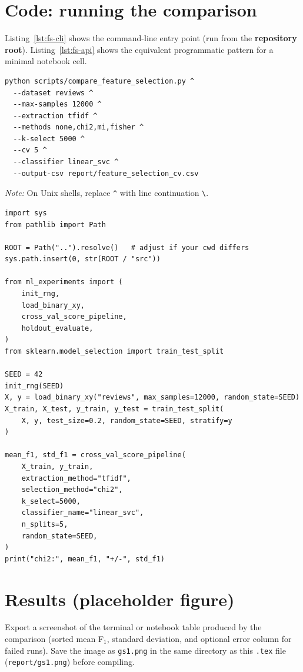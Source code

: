 \documentclass[11pt,a4paper]{report}
\begin{document}
\section{Code: running the comparison}

Listing~\ref{lst:fs-cli} shows the command-line entry point (run from the \textbf{repository root}). Listing~\ref{lst:fs-api} shows the equivalent programmatic pattern for a minimal notebook cell.

\begin{lstlisting}[style=py, caption={Shell: compare selectors with fixed TF---IDF and linear SVM (example).}, label={lst:fs-cli}]
python scripts/compare_feature_selection.py ^
  --dataset reviews ^
  --max-samples 12000 ^
  --extraction tfidf ^
  --methods none,chi2,mi,fisher ^
  --k-select 5000 ^
  --cv 5 ^
  --classifier linear_svc ^
  --output-csv report/feature_selection_cv.csv
\end{lstlisting}
\textit{Note:} On Unix shells, replace \texttt{\^{}} with line continuation \texttt{\textbackslash}.

\begin{lstlisting}[style=py, caption={Python: same logic inside a notebook or driver script.}, label={lst:fs-api}]
import sys
from pathlib import Path

ROOT = Path("..").resolve()   # adjust if your cwd differs
sys.path.insert(0, str(ROOT / "src"))

from ml_experiments import (
    init_rng,
    load_binary_xy,
    cross_val_score_pipeline,
    holdout_evaluate,
)
from sklearn.model_selection import train_test_split

SEED = 42
init_rng(SEED)
X, y = load_binary_xy("reviews", max_samples=12000, random_state=SEED)
X_train, X_test, y_train, y_test = train_test_split(
    X, y, test_size=0.2, random_state=SEED, stratify=y
)

mean_f1, std_f1 = cross_val_score_pipeline(
    X_train, y_train,
    extraction_method="tfidf",
    selection_method="chi2",
    k_select=5000,
    classifier_name="linear_svc",
    n_splits=5,
    random_state=SEED,
)
print("chi2:", mean_f1, "+/-", std_f1)
\end{lstlisting}

\section{Results (placeholder figure)}

Export a screenshot of the terminal or notebook table produced by the comparison (sorted mean F$_1$, standard deviation, and optional error column for failed runs). Save the image as \texttt{gs1.png} in the same directory as this \texttt{.tex} file (\texttt{report/gs1.png}) before compiling.
\end{document}
